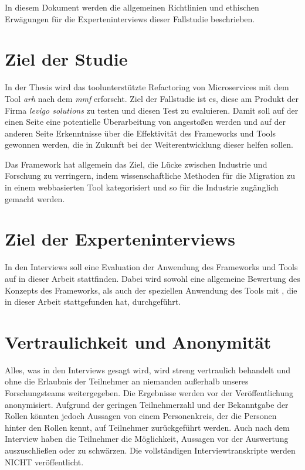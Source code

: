 In diesem Dokument werden die allgemeinen Richtlinien und ethischen Erwägungen für die Experteninterviews dieser Fallstudie beschrieben.

\section{Ziel der Studie}

In der Thesis wird das toolunterstützte Refactoring von Microservices mit dem Tool \emph{\acrlong{arh}} nach dem \emph{\acrlong{mmf}} erforscht.
Ziel der Fallstudie ist es, diese am Produkt \jf der Firma \emph{levigo solutions} zu testen und diesen Test zu evaluieren.
Damit soll auf der einen Seite eine potentielle Überarbeitung von \jf angestoßen werden und auf der anderen Seite Erkenntnisse über die Effektivität des Frameworks und Tools gewonnen werden, die in Zukunft bei der Weiterentwicklung dieser helfen sollen.

Das Framework hat allgemein das Ziel, die Lücke zwischen Industrie und Forschung zu verringern, indem wissenschaftliche Methoden für die Migration zu  in einem webbasierten Tool kategorisiert und so für die Industrie zugänglich gemacht werden.

\section{Ziel der Experteninterviews}

In den Interviews soll eine Evaluation der Anwendung des Frameworks und Tools auf \jf in dieser Arbeit stattfinden.
Dabei wird sowohl eine allgemeine Bewertung des Konzepts des Frameworks, als auch der speziellen Anwendung des Tools mit \jf, die in dieser Arbeit stattgefunden hat, durchgeführt.
\section{Vertraulichkeit und Anonymität}
Alles, was in den Interviews gesagt wird, wird streng vertraulich behandelt und ohne die Erlaubnis der Teilnehmer an niemanden außerhalb unseres Forschungsteams weitergegeben.
Die Ergebnisse werden vor der Veröffentlichung anonymisiert.
Aufgrund der geringen Teilnehmerzahl und der Bekanntgabe der Rollen könnten jedoch Aussagen von einem Personenkreis, der die Personen hinter den Rollen kennt, auf Teilnehmer zurückgeführt werden.
Auch nach dem Interview haben die Teilnehmer die Möglichkeit, Aussagen vor der Auswertung auszuschließen oder zu schwärzen.
Die vollständigen Interviewtranskripte werden NICHT veröffentlicht.

